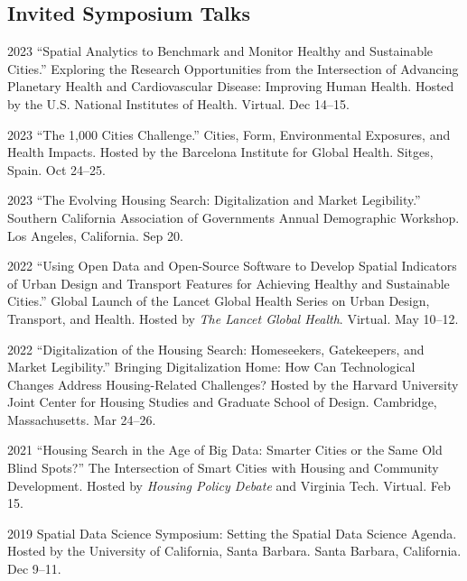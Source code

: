 \documentclass[11pt,letterpaper]{report} %
\begin{document}
    \subsection*{Invited Symposium Talks}

    \begin{tablist}

    \item[2023] \tab{}\enquote{Spatial Analytics to Benchmark and Monitor Healthy and Sustainable Cities.} Exploring the Research Opportunities from the Intersection of Advancing Planetary Health and Cardiovascular Disease: Improving Human Health. Hosted by the U.S. National Institutes of Health. Virtual. Dec 14--15.

    \item[2023] \tab{}\enquote{The 1,000 Cities Challenge.} Cities, Form, Environmental Exposures, and Health Impacts. Hosted by the Barcelona Institute for Global Health. Sitges, Spain. Oct 24--25.

    \item[2023] \tab{}\enquote{The Evolving Housing Search: Digitalization and Market Legibility.} Southern California Association of Governments Annual Demographic Workshop. Los Angeles, California. Sep 20.

    \item[2022] \tab{}\enquote{Using Open Data and Open-Source Software to Develop Spatial Indicators of Urban Design and Transport Features for Achieving Healthy and Sustainable Cities.} Global Launch of the Lancet Global Health Series on Urban Design, Transport, and Health. Hosted by \textit{The Lancet Global Health}. Virtual. May 10--12.

    \item[2022] \tab{}\enquote{Digitalization of the Housing Search: Homeseekers, Gatekeepers, and Market Legibility.} Bringing Digitalization Home: How Can Technological Changes Address Housing-Related Challenges? Hosted by the Harvard University Joint Center for Housing Studies and Graduate School of Design. Cambridge, Massachusetts. Mar 24--26.

    \item[2021] \tab{}\enquote{Housing Search in the Age of Big Data: Smarter Cities or the Same Old Blind Spots?} The Intersection of Smart Cities with Housing and Community Development. Hosted by \textit{Housing Policy Debate} and Virginia Tech. Virtual. Feb 15.

    \item[2019] \tab{}Spatial Data Science Symposium: Setting the Spatial Data Science Agenda. Hosted by the University of California, Santa Barbara. Santa Barbara, California. Dec 9--11.

    \end{tablist}
\end{document}
